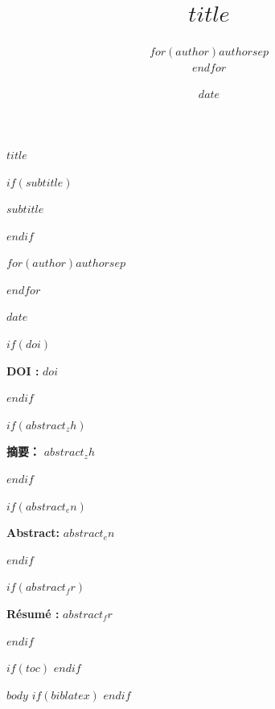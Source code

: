 \documentclass[11pt]{article}
\title{$title$}
\author{$for(author)$$author$$sep$ \\ $endfor$}
\date{$date$}
\newcommand{\doclang}{en} %
\newcommand{\ifdoclang}[3]{%
  \ifstrequal{\doclang}{#1}{#2}{#3}%
}
\renewcommand{\maketitle}{
  \begin{center}

    \vspace*{1cm}



    \begin{minipage}{0.95\textwidth}
      \centering
      \fontsize{20}{26}\selectfont
      \textbf{$title$%
        $if(title2)$
          \\
          $title2$
        $endif$%
        $if(title3)$
          \\
          $title3$
        $endif$%
      }
    \end{minipage}



    $if(subtitle)$

      \vspace{0.4cm}

      \begin{minipage}{0.95\textwidth}
        \centering
        \fontsize{13}{16}\selectfont
        \itshape
        $subtitle$
      \end{minipage}

    $endif$



    $if(author)$

      \vspace{0.6cm}

      \begin{minipage}{0.95\textwidth}
        \centering
        \Large
        $author$
      \end{minipage}

    $endif$



    $if(date)$

      \vspace{0.6cm}
      \Large $date$

    $endif$


  \end{center}

  \vspace{1cm}
}
\renewcommand{\maketitle}{
  \begin{center}
  \vspace*{1cm}
  
  \begin{minipage}{\textwidth}
  \centering
  \fontsize{20}{26}\selectfont\textbf{$title$}
  \end{minipage}
  
  \vspace{0.4cm}
  
  $if(subtitle)$   \begin{minipage}{\textwidth}
  \centering
  \fontsize{13}{16}\selectfont\itshape $subtitle$   \end{minipage}
  $endif$   
  \vspace{0.6cm}
  
  \begin{minipage}{\textwidth}
  \centering
  \Large
  $for(author)$$author$$sep$ \par $endfor$   \end{minipage}
  
  \vspace{0.6cm}
  
  \Large $date$   
  \end{center}
  \vspace{1cm}
}
\begin{document}
\maketitle

 $if(doi)$ 
\vspace{-0.5cm}
\begin{center}
\small\textbf{\ifdoclang{zh}{DOI：}{DOI :}} \href{https://doi.org/$doi$}{$doi$}
\end{center}
\vspace{0.5cm}
 $endif$ 
\thispagestyle{firstpage}

 $if(abstract_zh)$ \begin{center}
\begin{minipage}{0.85\textwidth}
\noindent \textbf{摘要：} $abstract_zh$ \end{minipage}
\end{center}
\vspace{1cm}
 $endif$ 


 $if(abstract_en)$ \begin{center}
\begin{minipage}{0.85\textwidth}
\noindent \textbf{Abstract:} $abstract_en$ \end{minipage}
\end{center}
\vspace{1cm}
 $endif$ 

 
 $if(abstract_fr)$ \begin{center}
\begin{minipage}{0.85\textwidth}
\noindent \textbf{Résumé :} $abstract_fr$ \end{minipage}
\end{center}
\vspace{1cm}
 $endif$ 
  
 $if(toc)$ \clearpage
\tableofcontents
\clearpage
 $endif$ 
\pagestyle{fancy}

 $body$ 
 $if(biblatex)$ 
 $endif$ 
\end{document}
